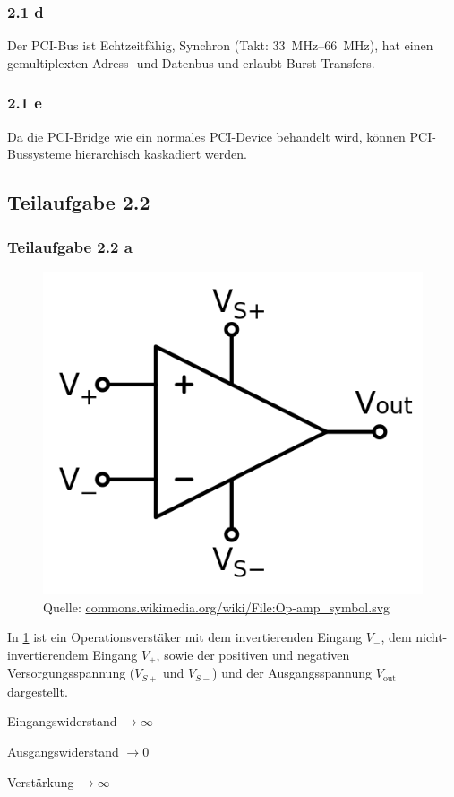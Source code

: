 \documentclass[a4paper]{scrartcl}
\begin{document}
  \subsubsection*{2.1 d}
  Der PCI-Bus ist Echtzeitfähig,
  Synchron (Takt: \SIrange[range-phrase = --]{33}{66}{\mega\hertz}),
  hat einen gemultiplexten Adress- und Datenbus und erlaubt Burst-Transfers.

  \subsubsection*{2.1 e}
  Da die PCI-Bridge wie ein normales PCI-Device behandelt wird, können
  PCI-Bussysteme hierarchisch kaskadiert werden.

  \subsection*{Teilaufgabe 2.2}
  \subsubsection*{Teilaufgabe 2.2 a}
  \begin{figure}[h]
      \centering
      \includegraphics*[width=0.5\linewidth, keepaspectratio]{op-verstaerker.png}
      \caption{Quelle: \href{https://commons.wikimedia.org/wiki/File:Op-amp_symbol.svg}{commons.wikimedia.org/wiki/File:Op-amp\_symbol.svg}}
      \label{fig:operationsverstaerker}
  \end{figure}

  In \cref{fig:operationsverstaerker} ist ein Operationsverstäker mit dem
  invertierenden Eingang $V_{-}$, dem nicht-invertierendem Eingang $V_{+}$,
  sowie der positiven und negativen Versorgungsspannung ($V_{S+}$ und $V_{S-}$)
  und der Ausgangsspannung $V_{\text{out}}$ dargestellt.\\
  \begin{enumerate*}[label=(\roman*)]
      \item Eingangswiderstand $\rightarrow \infty$
      \item Ausgangswiderstand $\rightarrow 0$
      \item Verstärkung $\rightarrow \infty$
  \end{enumerate*}
\end{document}
